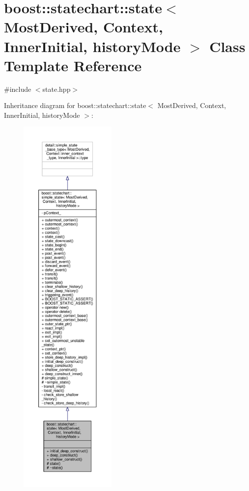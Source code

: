 \hypertarget{classboost_1_1statechart_1_1state}{}\section{boost\+:\+:statechart\+:\+:state$<$ Most\+Derived, Context, Inner\+Initial, history\+Mode $>$ Class Template Reference}
\label{classboost_1_1statechart_1_1state}


{\ttfamily \#include $<$state.\+hpp$>$}



Inheritance diagram for boost\+:\+:statechart\+:\+:state$<$ Most\+Derived, Context, Inner\+Initial, history\+Mode $>$\+:
\nopagebreak
\begin{figure}[H]
\begin{center}
\leavevmode
\includegraphics[height=550pt]{classboost_1_1statechart_1_1state__inherit__graph}
\end{center}
\end{figure}



